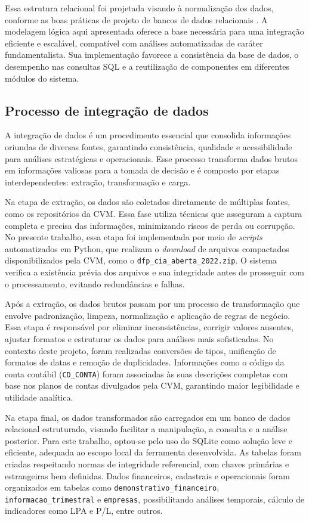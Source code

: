 \documentclass[recuosum=1.5cm]{iftex2024}
\begin{document}
Essa estrutura relacional foi projetada visando à normalização dos dados, conforme as boas práticas de projeto de bancos de dados relacionais \cite{elmasri:2016:fundamentals}. A modelagem lógica aqui apresentada oferece a base necessária para uma integração eficiente e escalável, compatível com análises automatizadas de caráter fundamentalista. Sua implementação favorece a consistência da base de dados, o desempenho nas consultas SQL e a reutilização de componentes em diferentes módulos do sistema.



\subsection{Processo de integração de dados}

A integração de dados é um procedimento essencial que consolida informações oriundas de diversas fontes, garantindo consistência, qualidade e acessibilidade para análises estratégicas e operacionais. Esse processo transforma dados brutos em informações valiosas para a tomada de decisão e é composto por etapas interdependentes: extração, transformação e carga.

Na etapa de extração, os dados são coletados diretamente de múltiplas fontes, como os repositórios da CVM. Essa fase utiliza técnicas que asseguram a captura completa e precisa das informações, minimizando riscos de perda ou corrupção. No presente trabalho, essa etapa foi implementada por meio de \textit{scripts} automatizados em Python, que realizam o \textit{download} de arquivos compactados disponibilizados pela CVM, como o \texttt{dfp\_cia\_aberta\_2022.zip}. O sistema verifica a existência prévia dos arquivos e sua integridade antes de prosseguir com o processamento, evitando redundâncias e falhas.

Após a extração, os dados brutos passam por um processo de transformação que envolve padronização, limpeza, normalização e aplicação de regras de negócio. Essa etapa é responsável por eliminar inconsistências, corrigir valores ausentes, ajustar formatos e estruturar os dados para análises mais sofisticadas. No contexto deste projeto, foram realizadas conversões de tipos, unificação de formatos de datas e remoção de duplicidades. Informações como o código da conta contábil (\texttt{CD\_CONTA}) foram associadas às suas descrições completas com base nos planos de contas divulgados pela CVM, garantindo maior legibilidade e utilidade analítica.

Na etapa final, os dados transformados são carregados em um banco de dados relacional estruturado, visando facilitar a manipulação, a consulta e a análise posterior. Para este trabalho, optou-se pelo uso do SQLite como solução leve e eficiente, adequada ao escopo local da ferramenta desenvolvida. As tabelas foram criadas respeitando normas de integridade referencial, com chaves primárias e estrangeiras bem definidas. Dados financeiros, cadastrais e operacionais foram organizados em tabelas como \texttt{demonstrativo\_financeiro}, \texttt{informacao\_trimestral} e \texttt{empresas}, possibilitando análises temporais, cálculo de indicadores como LPA e P/L, entre outros.
\end{document}
